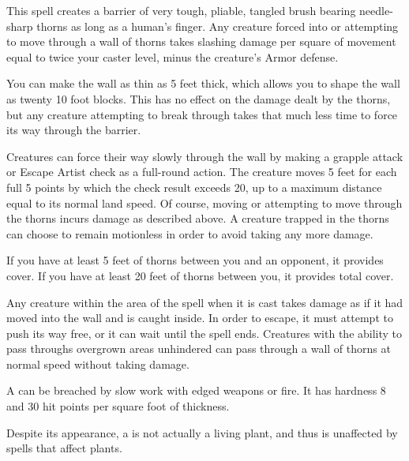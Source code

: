 \spellrng{\rngmed}
\begin{spelleffect}
  This spell creates a barrier of very tough, pliable, tangled brush bearing needle-sharp thorns as long as a human's finger. Any creature forced into or attempting to move through a wall of thorns takes slashing damage per square of movement equal to twice your caster level, minus the creature's Armor defense.
  \par You can make the wall as thin as 5 feet thick, which allows you to shape the wall as twenty 10 foot blocks. This has no effect on the damage dealt by the thorns, but any creature attempting to break through takes that much less time to force its way through the barrier.
  \par Creatures can force their way slowly through the wall by making a grapple attack or Escape Artist check as a full-round action. The creature moves 5 feet for each full 5 points by which the check result exceeds 20, up to a maximum distance equal to its normal land speed. Of course, moving or attempting to move through the thorns incurs damage as described above. A creature trapped in the thorns can choose to remain motionless in order to avoid taking any more damage.
  \par If you have at least 5 feet of thorns between you and an opponent, it provides cover. If you have at least 20 feet of thorns between you, it provides total cover.
  \par Any creature within the area of the spell when it is cast takes damage as if it had moved into the wall and is caught inside. In order to escape, it must attempt to push its way free, or it can wait until the spell ends. Creatures with the ability to pass throughs overgrown areas unhindered can pass through a wall of thorns at normal speed without taking damage.
\end{spelleffect}
\begin{spellnotes}
  A  can be breached by slow work with edged weapons or fire. It has hardness 8 and 30 hit points per square foot of thickness.
  \par Despite its appearance, a  is not actually a living plant, and thus is unaffected by spells that affect plants.
\end{spellnotes}

